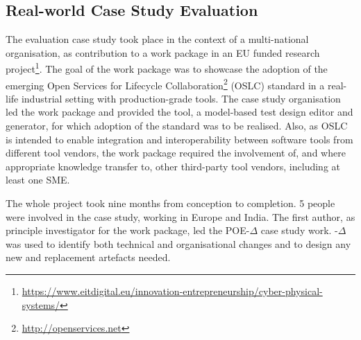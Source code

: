 \documentclass[runningheads,a4paper]{llncs}
\begin{document}
\subsection{Real-world Case Study Evaluation}
\label{caseStudy}
%
%

The evaluation case study took place in the context of a multi-national organisation, as contribution to a work package in an EU funded research project\footnote{\url{https://www.eitdigital.eu/innovation-entrepreneurship/cyber-physical-systems/}}. The goal of the work package was to showcase the adoption of the emerging Open Services for Lifecycle Collaboration\footnote{\url{http://openservices.net}} (OSLC) standard in a real-life industrial setting with production-grade tools. The case study organisation led the  work package and provided the tool, a model-based test design editor and generator, for which adoption of the standard was to be realised. Also, as OSLC is intended to enable integration and interoperability between software tools from different tool vendors, the work package required the involvement of, and where appropriate knowledge transfer to, other third-party tool vendors, including at least one SME. 

The whole project took nine months from conception to completion. 5 people were involved in the case study, working in Europe and India. The first author, as principle investigator for the work package, led the POE-$\Delta$ case study work. \POE{}-$\Delta$ was used to identify both technical and organisational changes and to design any new and replacement artefacts needed.
\end{document}
